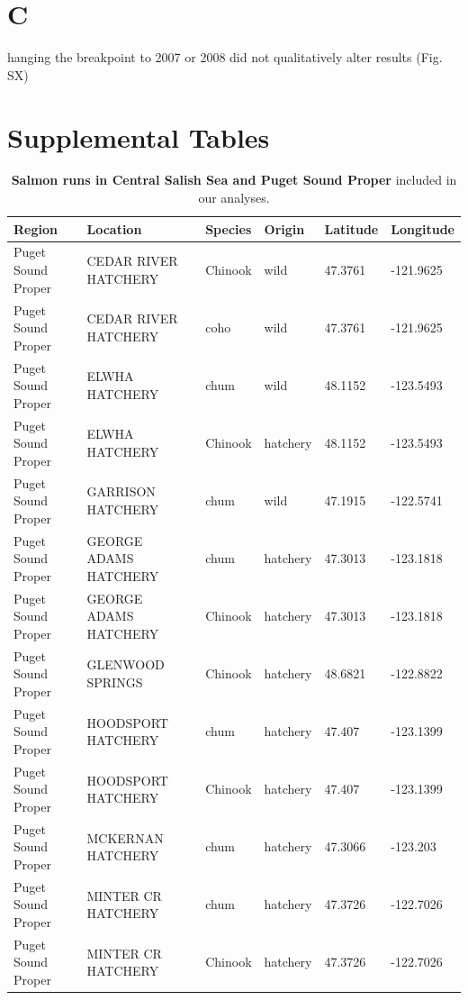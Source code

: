 \documentclass{article}
\begin{document}
\section* {C}hanging the breakpoint to 2007 or 2008 did not qualitatively alter results (Fig. SX)

\section* {Supplemental Tables}
\begin{table}[ht]
\centering
\caption{\textbf{Salmon runs in Central Salish Sea and Puget Sound Proper} included in our analyses.} 
\label{tab:salmon}
\begingroup\footnotesize
\begin{tabular}{|p{}|p{}|p{}|p{}|p{}|p{}|}
  \hline
Region & Location & Species & Origin & Latitude & Longitude \\ 
  \hline
Puget Sound Proper & CEDAR RIVER HATCHERY & Chinook & wild & 47.3761 & -121.9625 \\ 
  Puget Sound Proper & CEDAR RIVER HATCHERY & coho & wild & 47.3761 & -121.9625 \\ 
  Puget Sound Proper & ELWHA HATCHERY & chum & wild & 48.1152 & -123.5493 \\ 
  Puget Sound Proper & ELWHA HATCHERY & Chinook & hatchery & 48.1152 & -123.5493 \\ 
  Puget Sound Proper & GARRISON HATCHERY & chum & wild & 47.1915 & -122.5741 \\ 
  Puget Sound Proper & GEORGE ADAMS HATCHERY & chum & hatchery & 47.3013 & -123.1818 \\ 
  Puget Sound Proper & GEORGE ADAMS HATCHERY & Chinook & hatchery & 47.3013 & -123.1818 \\ 
  Puget Sound Proper & GLENWOOD SPRINGS & Chinook & hatchery & 48.6821 & -122.8822 \\ 
  Puget Sound Proper & HOODSPORT HATCHERY & chum & hatchery & 47.407 & -123.1399 \\ 
  Puget Sound Proper & HOODSPORT HATCHERY & Chinook & hatchery & 47.407 & -123.1399 \\ 
  Puget Sound Proper & MCKERNAN HATCHERY & chum & hatchery & 47.3066 & -123.203 \\ 
  Puget Sound Proper & MINTER CR HATCHERY & chum & hatchery & 47.3726 & -122.7026 \\ 
  Puget Sound Proper & MINTER CR HATCHERY & Chinook & hatchery & 47.3726 & -122.7026 \\ 

\end{tabular}
\end{table}
\end{document}
